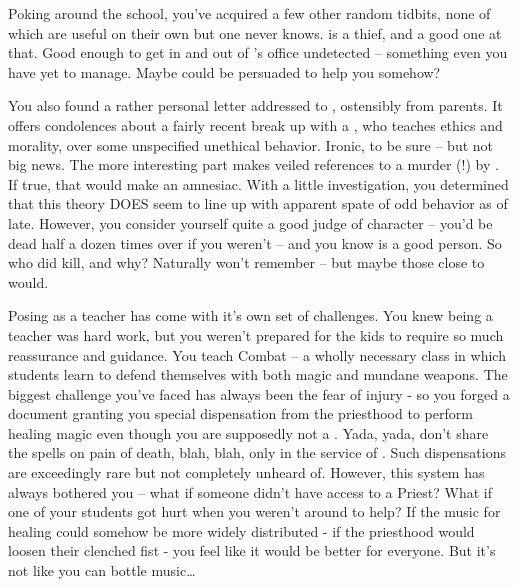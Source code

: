 \documentclass[char]{GL2020}
\begin{document}
Poking around the school, you’ve acquired a few other random tidbits, none of which are useful on their own but one never knows. \cPirateChild{} is a thief, and a good one at that. Good enough to get in and out of \cChupInventor{}’s office undetected -- something even you have yet to manage. Maybe \cPirateChild{} could be persuaded to help you somehow? 

You also found a rather personal letter addressed to \cLibrarian{}, ostensibly from \cLibrarian{\their} parents. It offers condolences about a fairly recent break up with a \cEthics{}, who teaches ethics and morality, over some unspecified unethical behavior. Ironic, to be sure -- but not big news. The more interesting part makes veiled references to a murder (!) by \cLibrarian{}. If true, that would make \cLibrarian{} an amnesiac. With a little investigation, you determined that this theory DOES seem to line up with \cLibrarian{\their} apparent spate of odd behavior as of late. However, you consider yourself quite a good judge of character -- you’d be dead half a dozen times over if you weren’t -- and you know \cLibrarian{} is a good person. So who did \cLibrarian{} kill, and why? Naturally \cLibrarian{} won’t remember -- but maybe those close to \cLibrarian{\them} would.

Posing as a teacher has come with it’s own set of challenges. You knew being a teacher was hard work, but you weren’t prepared for the kids to require so much reassurance and guidance. You teach Combat -- a wholly necessary class in which students learn to defend themselves with both magic and mundane weapons. The biggest challenge you’ve faced has always been the fear of injury - so you forged a document granting you special dispensation from the priesthood to perform healing magic even though you are supposedly not a \cInterpol{\cleric}. Yada, yada, don’t share the spells on pain of death, blah, blah, only in the service of \cFarmGod{}. Such dispensations are exceedingly rare but not completely unheard of. However, this system has always bothered you -- what if someone didn’t have access to a Priest? What if one of your students got hurt when you weren’t around to help? If the music for healing could somehow be more widely distributed - if the priesthood would loosen their clenched fist - you feel like it would be better for everyone. But it’s not like you can bottle music\ldots
\end{document}
